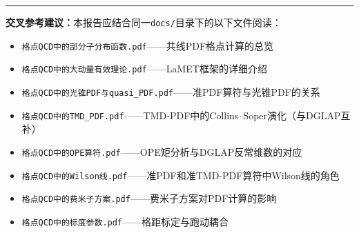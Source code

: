 \documentclass[12pt,a4paper]{ctexart}
\theoremstyle{definition}
\begin{document}
\vspace{0.5cm}
\noindent\rule{\textwidth}{0.5pt}
\small
\textbf{交叉参考建议：}本报告应结合同一\texttt{docs/}目录下的以下文件阅读：
\begin{itemize}[nosep]
    \item \texttt{格点QCD中的部分子分布函数.pdf}——共线PDF格点计算的总览
    \item \texttt{格点QCD中的大动量有效理论.pdf}——LaMET框架的详细介绍
    \item \texttt{格点QCD中的光锥PDF与quasi\_PDF.pdf}——准PDF算符与光锥PDF的关系
    \item \texttt{格点QCD中的TMD\_PDF.pdf}——TMD-PDF中的Collins--Soper演化（与DGLAP互补）
    \item \texttt{格点QCD中的OPE算符.pdf}——OPE矩分析与DGLAP反常维数的对应
    \item \texttt{格点QCD中的Wilson线.pdf}——准PDF和准TMD-PDF算符中Wilson线的角色
    \item \texttt{格点QCD中的费米子方案.pdf}——费米子方案对PDF计算的影响
    \item \texttt{格点QCD中的标度参数.pdf}——格距标定与跑动耦合
\end{itemize}
\end{document}
